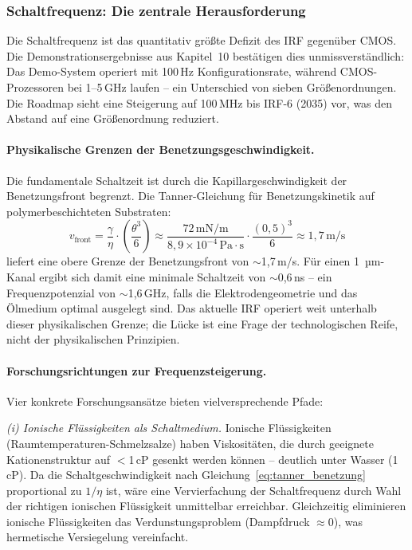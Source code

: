 ﻿\documentclass[a4paper,12pt]{scrreprt}
\theoremstyle{definition}
\begin{document}
\subsubsection{Schaltfrequenz: Die zentrale Herausforderung}
\label{subsubsec:frequenz}

Die Schaltfrequenz ist das quantitativ größte Defizit des IRF gegenüber
CMOS. Die Demonstrationsergebnisse aus Kapitel~10 bestätigen dies
unmissverständlich: Das Demo-System operiert mit 100\,Hz Konfigurationsrate,
während CMOS-Prozessoren bei 1--5\,GHz laufen -- ein Unterschied von
sieben Größenordnungen. Die Roadmap sieht eine Steigerung auf 100\,MHz
bis IRF-6 (2035) vor, was den Abstand auf eine Größenordnung reduziert.

\paragraph{Physikalische Grenzen der Benetzungsgeschwindigkeit.}
Die fundamentale Schaltzeit ist durch die Kapillargeschwindigkeit
der Benetzungsfront begrenzt. Die Tanner-Gleichung für
Benetzungskinetik auf polymerbeschichteten Substraten:
\begin{equation}
	v_\text{front} = \frac{\gamma}{\eta} \cdot \left(\frac{\theta^3}{6}\right)
	\approx \frac{72\,\text{mN/m}}{8{,}9 \times 10^{-4}\,\text{Pa}\cdot\text{s}}
	\cdot \frac{(0{,}5)^3}{6}
	\approx 1{,}7\,\text{m/s}
	\label{eq:tanner_benetzung}
\end{equation}
liefert eine obere Grenze der Benetzungsfront von $\sim$1,7\,m/s.
Für einen 1\, µm-Kanal ergibt sich damit eine minimale Schaltzeit von
$\sim$0,6\,ns -- ein Frequenzpotenzial von $\sim$1,6\,GHz, falls
die Elektrodengeometrie und das Ölmedium optimal ausgelegt sind.
Das aktuelle IRF operiert weit unterhalb dieser physikalischen Grenze;
die Lücke ist eine Frage der technologischen Reife, nicht der
physikalischen Prinzipien.

\paragraph{Forschungsrichtungen zur Frequenzsteigerung.}
Vier konkrete Forschungsansätze bieten vielversprechende Pfade:

\textit{(i) Ionische Flüssigkeiten als Schaltmedium.} Ionische Flüssigkeiten
(Raumtemperaturen-Schmelzsalze) haben Viskositäten, die durch geeignete
Kationenstruktur auf $<$1\,cP gesenkt werden können -- deutlich unter Wasser
(1\,cP). Da die Schaltgeschwindigkeit nach Gleichung~\eqref{eq:tanner_benetzung}
proportional zu $1/\eta$ ist, wäre eine Vervierfachung der Schaltfrequenz
durch Wahl der richtigen ionischen Flüssigkeit unmittelbar erreichbar.
Gleichzeitig eliminieren ionische Flüssigkeiten das Verdunstungsproblem
(Dampfdruck $\approx 0$), was hermetische Versiegelung vereinfacht.
\end{document}
